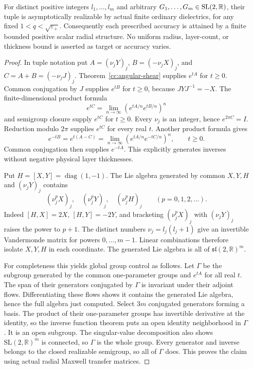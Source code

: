 \begin{theorem}
\label{cc:global-control}
For distinct positive integers $l_1,\ldots,l_m$ and arbitrary
$G_1,\ldots,G_m\in{\rm SL}(2,\mathbb R)$, their tuple is
asymptotically realizable by actual finite ordinary dielectrics,
for any fixed $1<q<\sqrt{\varepsilon_+}$. Consequently each
prescribed accuracy is attained by a finite bounded positive
scalar radial structure. No uniform radius, layer-count, or
thickness bound is asserted as target or accuracy varies.
\end{theorem}
\begin{proof}
In tuple notation put
$A=(\nu_jY)_j$, $B=(-\nu_jX)_j$, and $C=A+B=(-\nu_jJ)_j$.
Theorem~\ref{cc:angular-shear} supplies $e^{tA}$ for $t\geq0$.
Common conjugation by $J$ supplies $e^{tB}$ for $t\geq0$,
because $JYJ^{-1}=-X$. The finite-dimensional product formula
\[
 e^{tC}=\lim_{n\to\infty}(e^{tA/n}e^{tB/n})^n
\]
and semigroup closure supply $e^{tC}$ for $t\geq0$.
Every $\nu_j$ is an integer, hence $e^{2\pi C}=I$.
Reduction modulo $2\pi$ supplies $e^{tC}$ for every real $t$.
Another product formula gives
\[
 e^{-tB}=e^{t(A-C)}
       =\lim_{n\to\infty}(e^{tA/n}e^{-tC/n})^n,\qquad t\geq0.
\]
Common conjugation then supplies $e^{-tA}$. This explicitly
generates inverses without negative physical layer thicknesses.

Put $H=[X,Y]=\operatorname{diag}(1,-1)$. The Lie algebra
generated by common $X,Y,H$ and $(\nu_jY)_j$ contains
\[
 (\nu_j^pX)_j,\quad(\nu_j^pY)_j,\quad(\nu_j^pH)_j
       \qquad(p=0,1,2,\ldots).
\]
Indeed $[H,X]=2X$, $[H,Y]=-2Y$, and bracketing
$(\nu_j^pX)_j$ with $(\nu_jY)_j$ raises the power to $p+1$.
The distinct numbers $\nu_j=l_j(l_j+1)$ give an invertible
Vandermonde matrix for powers $0,\ldots,m-1$. Linear combinations
therefore isolate $X,Y,H$ in each coordinate. The generated Lie
algebra is all of $\mathfrak{sl}(2,\mathbb R)^m$.

For completeness this yields global group control as follows.
Let $\Gamma$ be the subgroup generated by the common
one-parameter groups and $e^{tA}$ for all real $t$.
The span of their generators conjugated by $\Gamma$ is invariant
under their adjoint flows. Differentiating these flows shows it
contains the generated Lie algebra, hence the full algebra just
computed. Select $3m$ conjugated generators forming a basis.
The product of their one-parameter groups has invertible
derivative at the identity, so the inverse function theorem puts
an open identity neighborhood in $\Gamma$. It is an open
subgroup. The singular-value decomposition also shows
$\mathrm{SL}(2,\mathbb R)^m$ is connected, so $\Gamma$ is the
whole group. Every generator and inverse belongs to the closed
realizable semigroup, so all of $\Gamma$ does. This proves the
claim using actual radial Maxwell transfer matrices.
\end{proof}

